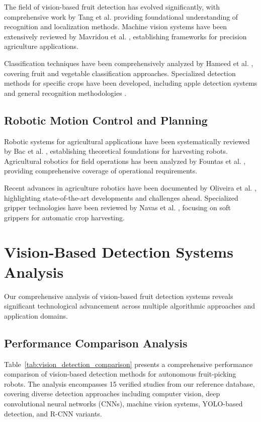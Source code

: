 \documentclass{ieeeaccess}
\begin{document}
The field of vision-based fruit detection has evolved significantly, with comprehensive work by Tang et al. \cite{tang2020recognition} providing foundational understanding of recognition and localization methods. Machine vision systems have been extensively reviewed by Mavridou et al. \cite{mavridou2019machine}, establishing frameworks for precision agriculture applications.

Classification techniques have been comprehensively analyzed by Hameed et al. \cite{hameed2018comprehensive}, covering fruit and vegetable classification approaches. Specialized detection methods for specific crops have been developed, including apple detection systems \cite{jia2020apple} and general recognition methodologies \cite{darwin2021recognition}.

\subsection{Robotic Motion Control and Planning}

Robotic systems for agricultural applications have been systematically reviewed by Bac et al. \cite{bac2014harvesting}, establishing theoretical foundations for harvesting robots. Agricultural robotics for field operations has been analyzed by Fountas et al. \cite{fountas2020agricultural}, providing comprehensive coverage of operational requirements.

Recent advances in agriculture robotics have been documented by Oliveira et al. \cite{oliveira2021advances}, highlighting state-of-the-art developments and challenges ahead. Specialized gripper technologies have been reviewed by Navas et al. \cite{navas2021soft}, focusing on soft grippers for automatic crop harvesting.

\section{Vision-Based Detection Systems Analysis}
\label{sec:vision}

Our comprehensive analysis of vision-based fruit detection systems reveals significant technological advancement across multiple algorithmic approaches and application domains.

\subsection{Performance Comparison Analysis}

Table~\ref{tab:vision_detection_comparison} presents a comprehensive performance comparison of vision-based detection methods for autonomous fruit-picking robots. The analysis encompasses 15 verified studies from our reference database, covering diverse detection approaches including computer vision, deep convolutional neural networks (CNNs), machine vision systems, YOLO-based detection, and R-CNN variants.
\end{document}
